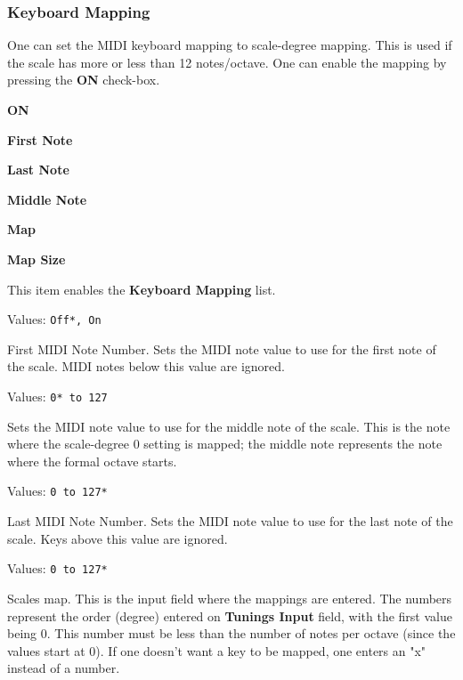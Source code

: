 \subsubsection{Keyboard Mapping}
\label{subsubsec:scales_keyboard_mapping}

   One can set the MIDI keyboard mapping to scale-degree mapping.
   This is used if the scale has more or less than 12 notes/octave.
   One can enable the mapping by pressing the \textbf{ON} check-box.

   \begin{enumber}
      \item \textbf{ON}
      \item \textbf{First Note}
      \item \textbf{Last Note}
      \item \textbf{Middle Note}
      \item \textbf{Map}
      \item \textbf{Map Size}
   \end{enumber}

   \setcounter{ItemCounter}{0}      %

   This item enables the \textbf{Keyboard Mapping} list.

   Values: \texttt{Off*, On}

   First MIDI Note Number.
   Sets the MIDI note value to use for the first note of the scale.
   MIDI notes below this value are ignored.

   Values: \texttt{0* to 127}

   Sets the MIDI note value to use for the middle note of the scale.
   This is the note where the scale-degree 0 setting is mapped;
   the middle note represents the note where the formal octave starts.

   Values: \texttt{0 to 127*}

   Last MIDI Note Number.
   Sets the MIDI note value to use for the last note of the scale.
   Keys above this value are ignored.

   Values: \texttt{0 to 127*}

   Scales map.  This is the input field where the mappings are entered.
   The numbers represent the order (degree) entered on
   \textbf{Tunings Input} field, with the first value being 0.
   This number must be less than the number of notes per octave (since
   the values start at 0).
   If one doesn't want a key to be mapped, one enters an "x" instead of a
   number.

